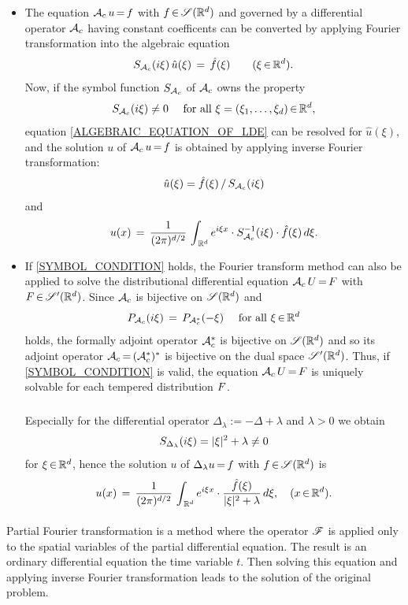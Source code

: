 \documentclass[11pt,twoside]{article}
\begin{document}
\begin{itemize}
\item[1.]
The equation ${\mathcal{A}}_c \, u {\,=\,} f$ with $f {\,\in\,} \mathscr{S}({\mathbb{R}}^d)$
and governed by a differential operator ${\mathcal{A}}_c$ having constant coefficents
can be converted by applying Fourier transformation
into the algebraic equation
\begin{equation}\label{ALGEBRAIC_EQUATION_OF_LDE}
S_{{\mathcal{A}}_c}(i \xi) \, \hat{u}(\xi) \,=\, \hat{f}(\xi)
\quad \quad (\xi {\,\in\,} {\mathbb{R}}^d).
\end{equation}
Now,
if the symbol function $S_{{\mathcal{A}}_c}$ of ${\mathcal{A}}_c$ owns the property
\begin{equation}\label{SYMBOL_CONDITION}
S_{{\mathcal{A}}_c}(i \xi) \neq 0
\quad \mbox{ for all } \xi = (\xi_1,\ldots,\xi_d) {\,\in\,} {\mathbb{R}}^d,
\end{equation}
equation \eqref{ALGEBRAIC_EQUATION_OF_LDE} can be resolved for $\hat{u}(\xi)$,
and the solution $u$ of ${\mathcal{A}}_c \,u {\,=\,} f$
is obtained by applying inverse Fourier transformation:
\[
\hat{u}(\xi) = \hat{f}(\xi) \, / \, S_{{\mathcal{A}}_c}(i \xi)
\]
and
\[
u(x) \,=\, \frac{1}{(2 \pi)^{d/2}} \,
\int_{\,{\mathbb{R}}^d}
e^{i \xi x} \cdot S_{{\mathcal{A}}_c}^{-1}(i \xi) \cdot \hat{f}(\xi) \, d \xi.
\]

\item[2.]
If \eqref{SYMBOL_CONDITION} holds,
the Fourier transform method can also be applied
to solve the distributional differential equation
${\mathcal{A}}_c \, U {\,=\,} F$ with $F {\,\in\,} \mathscr{S}'({\mathbb{R}}^d)$.
Since ${\mathcal{A}}_c$ is bijective on $\mathscr{S}({\mathbb{R}}^d)$ and 
\[
P_{{\mathcal{A}}_c}(i \xi) \,=\, P_{{\mathcal{A}}_c^*}(-\xi)
\quad \mbox{ for all } \xi {\,\in\,} {\mathbb{R}}^d
\]
holds,
the formally adjoint operator ${\mathcal{A}}_c^*$
is bijective on $\mathscr{S}({\mathbb{R}}^d)$ and so its adjoint operator
${\mathcal{A}}_c {\,=\,} ({\mathcal{A}}_c^*)^*$ is bijective on the dual space $\mathscr{S}'({\mathbb{R}}^d)$.
Thus,
if \eqref{SYMBOL_CONDITION} is valid,
the equation ${\mathcal{A}}_c \, U {\,=\,} F$
is uniquely solvable for each tempered distribution $F$.

\subparagraph{}
Especially for the differential operator 
$\Delta{_\lambda} := -\Delta + \lambda$ and $\lambda > 0$ we obtain
\[
S_{\Delta_{\lambda}}(i \xi) = \abs{\xi} ^2 + \lambda \neq 0
\]
for $\xi {\,\in\,} {\mathbb{R}}^d$,
hence the solution $u$ of $\Delta_{\lambda} u {\,=\,} f$ with $f {\,\in\,} \mathscr{S}({\mathbb{R}}^d)$ is
\[
u(x) \=
\frac{1}{(2 \pi)^{d/2}} \,
\int_{\,\Rd} e^{i \xi x}
\cdot \frac{\hat{f}(\xi)}{\abs{\xi} ^2 + \lambda} \, d \xi, \quad (x \xeof \Rd).
\]
\end{itemize}

\paragraph{} %
Partial Fourier transformation is a method
where the operator $\mathscr{F}$ is applied only to the spatial variables
of the partial differential equation.
The result is an ordinary differential equation
{\wrt} the time variable $t$.
Then solving this equation and applying inverse Fourier transformation
leads to the solution of the original problem.
\end{document}
